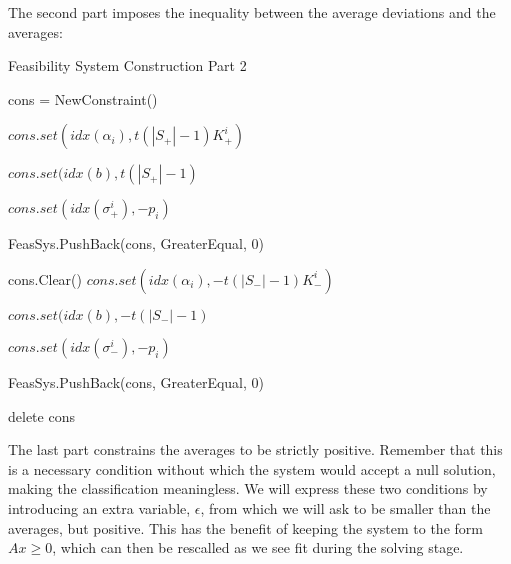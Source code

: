 \documentclass[a4paper,twoside,10pt]{report}
\begin{document}
	
	
	The second part imposes the inequality between the average deviations and the averages:
	
	\begin{algorithm}
	
	\caption{Feasibility System Construction Part 2}
	\label{feassystemconstruction2}		
	
	\begin{center}
	\begin{algorithmic}	
	
	\STATE cons = NewConstraint()
	
		\STATE \(cons.set(idx(\alpha_i), t(|S_+| - 1)K^i_+)\)		
	\ENDFOR
	
	\STATE\(cons.set(idx(b), t(|S_+| - 1)\)
	
		\STATE \(cons.set(idx(\sigma^i_+), -p_i)\)
	\ENDFOR
	
	\STATE FeasSys.PushBack(cons, GreaterEqual, 0)
	
	\STATE cons.Clear()
		\STATE \(cons.set(idx(\alpha_i), -t(|S_-| - 1)K^i_-)\)
	\ENDFOR
	
	\STATE\(cons.set(idx(b), -t(|S_-| - 1)\)
	
		\STATE \(cons.set(idx(\sigma^i_-), -p_i)\)
	\ENDFOR
	
	\STATE FeasSys.PushBack(cons, GreaterEqual, 0)
	
	\STATE delete cons
	
	\end{algorithmic}
	\end{center}
	\end{algorithm}	
	
	\clearpage
	
	The last part constrains the averages to be strictly positive. Remember that this is a necessary condition without which the system would accept a null solution, making the classification meaningless. 
	We will express these two conditions by introducing an extra variable, \(\epsilon\), from which we will ask to be smaller than the averages, but positive. This has the benefit of keeping the system to the form \(Ax \geq 0\), which can then be rescalled as we see fit during the solving stage.
	
\end{document}
